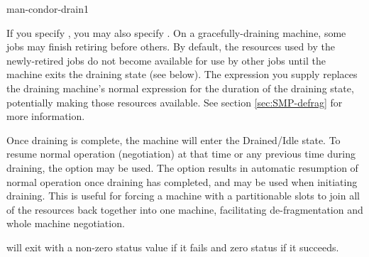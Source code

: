 \begin{ManPage}{}{man-condor-drain}{1}
\begin{description}
\end{description}

If you specify , you may also specify .  On a
gracefully-draining machine, some jobs may finish retiring before others.
By default, the resources used by the newly-retired jobs do not become
available for use by other jobs until the machine exits the draining state
(see below).  The  expression you supply replaces the draining
machine's normal  expression for the duration of the draining
state, potentially making those resources available.  See section
\ref{sec:SMP-defrag} for more information.

Once draining is complete, the machine will enter the Drained/Idle
state.  To resume normal operation (negotiation) at that time 
or any previous time during draining,
the  option may be used.  
The  option results in
automatic resumption of normal operation once draining has completed, 
and may be used when initiating draining.  
This is useful for forcing a machine with a partitionable
slots to join all of the resources back together into one machine,
facilitating de-fragmentation and whole machine negotiation.

\begin{Options}
  \ToolDebugDesc
\end{Options}

\ExitStatus

 will exit with a non-zero status value if it fails and
zero status if it succeeds.

\end{ManPage}
